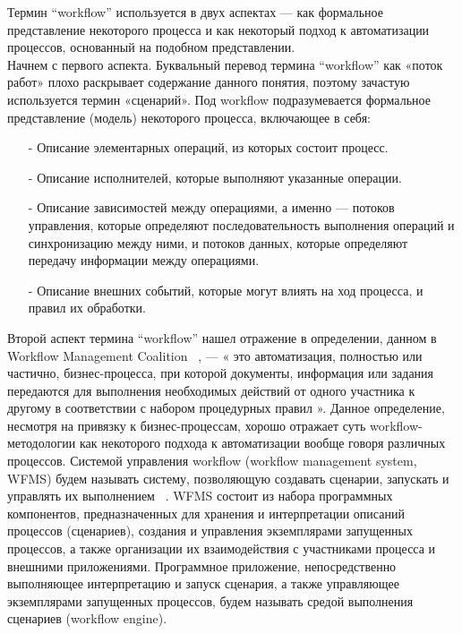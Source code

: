 \documentclass[a4paper,12pt]{article}
\begin{document}
Термин “workflow” используется в двух аспектах — как формальное
представление некоторого процесса и как некоторый подход к автоматизации процессов, основанный на подобном представлении.\\
Начнем с первого аспекта. Буквальный перевод термина “workflow”
как «поток работ» плохо раскрывает содержание данного понятия, поэтому
зачастую используется термин «сценарий». Под workflow подразумевается формальное представление (модель) некоторого процесса, включающее в себя:
\begin{enumerate}
\item[-] Описание элементарных операций, из которых состоит процесс.
\item[-] Описание исполнителей, которые выполняют указанные операции.
\item[-] Описание зависимостей между операциями, а именно — потоков управления, которые определяют последовательность выполнения
операций и синхронизацию между ними, и потоков данных, которые
определяют передачу информации между операциями.
\item[-] Описание внешних событий, которые могут влиять на ход процесса, и правил их обработки.
\end{enumerate}
Второй аспект термина “workflow” нашел отражение в определении,
данном в Workflow Management Coalition ~\cite{2}, — « это автоматизация, полностью или частично, бизнес-процесса, при которой документы, информация или задания передаются для выполнения необходимых действий
от одного участника к другому в соответствии с набором процедурных
правил ». Данное определение, несмотря на привязку к бизнес-процессам, хорошо отражает суть workflow-методологии как некоторого подхода
к автоматизации вообще говоря различных процессов.
Системой управления workflow (workflow management system, WFMS)
будем называть систему, позволяющую создавать сценарии, запускать
и управлять их выполнением ~\cite{2}. WFMS состоит из набора программных
компонентов, предназначенных для хранения и интерпретации описаний
процессов (сценариев), создания и управления экземплярами запущенных процессов, а также организации их взаимодействия с участниками
процесса и внешними приложениями.
Программное приложение, непосредственно выполняющее интерпретацию и запуск сценария, а также управляющее экземплярами запущенных процессов, будем называть средой выполнения сценариев (workflow engine).
\end{document}
